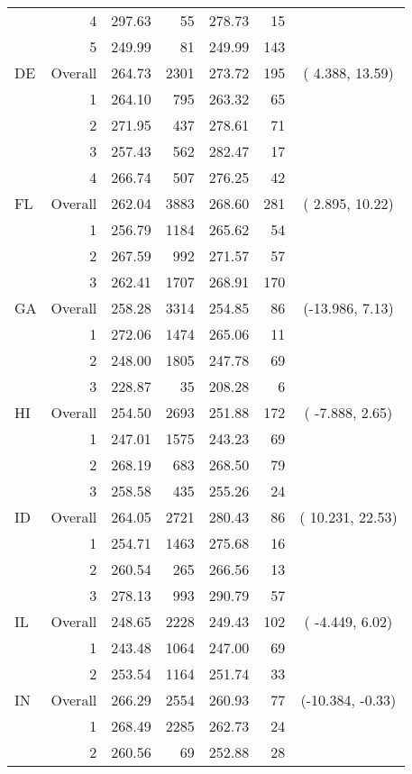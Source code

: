 \begin{longtable}{lrrr@{\extracolsep{.25cm}}rrc}
   & 4 & 297.63 &  55 & 278.73 &  15 &  \\ 
   & 5 & 249.99 &  81 & 249.99 & 143 &  \\ 
   \hline
DE & Overall & 264.73 & 2301 & 273.72 & 195 & (  4.388, 13.59) \\ 
   & 1 & 264.10 & 795 & 263.32 &  65 &  \\ 
   & 2 & 271.95 & 437 & 278.61 &  71 &  \\ 
   & 3 & 257.43 & 562 & 282.47 &  17 &  \\ 
   & 4 & 266.74 & 507 & 276.25 &  42 &  \\ 
   \hline
FL & Overall & 262.04 & 3883 & 268.60 & 281 & (  2.895, 10.22) \\ 
   & 1 & 256.79 & 1184 & 265.62 &  54 &  \\ 
   & 2 & 267.59 & 992 & 271.57 &  57 &  \\ 
   & 3 & 262.41 & 1707 & 268.91 & 170 &  \\ 
   \hline
GA & Overall & 258.28 & 3314 & 254.85 &  86 & (-13.986,  7.13) \\ 
   & 1 & 272.06 & 1474 & 265.06 &  11 &  \\ 
   & 2 & 248.00 & 1805 & 247.78 &  69 &  \\ 
   & 3 & 228.87 &  35 & 208.28 &   6 &  \\ 
   \hline
HI & Overall & 254.50 & 2693 & 251.88 & 172 & ( -7.888,  2.65) \\ 
   & 1 & 247.01 & 1575 & 243.23 &  69 &  \\ 
   & 2 & 268.19 & 683 & 268.50 &  79 &  \\ 
   & 3 & 258.58 & 435 & 255.26 &  24 &  \\ 
   \hline
ID & Overall & 264.05 & 2721 & 280.43 &  86 & ( 10.231, 22.53) \\ 
   & 1 & 254.71 & 1463 & 275.68 &  16 &  \\ 
   & 2 & 260.54 & 265 & 266.56 &  13 &  \\ 
   & 3 & 278.13 & 993 & 290.79 &  57 &  \\ 
   \hline
IL & Overall & 248.65 & 2228 & 249.43 & 102 & ( -4.449,  6.02) \\ 
   & 1 & 243.48 & 1064 & 247.00 &  69 &  \\ 
   & 2 & 253.54 & 1164 & 251.74 &  33 &  \\ 
   \hline
IN & Overall & 266.29 & 2554 & 260.93 &  77 & (-10.384, -0.33) \\ 
   & 1 & 268.49 & 2285 & 262.73 &  24 &  \\ 
   & 2 & 260.56 &  69 & 252.88 &  28 &  \\ 

\end{longtable}
